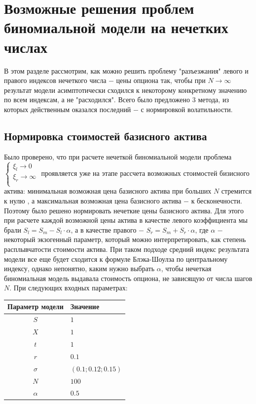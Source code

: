 \documentclass[a4paper,12pt]{extarticle} %
\begin{document}
	\section{Возможные решения проблем биномиальной модели на нечетких числах}
	В этом разделе рассмотрим, как можно решить проблему "разъезжания" левого и правого индексов нечеткого числа $-$ цены опциона так, чтобы при $N \to \infty$ результат модели асимптотически сходился к некоторому конкретному значению по всем индексам, а не "расходился". Всего было предложено $3$ метода, из которых действенным оказался последний $-$ с нормировкой волатильности. 
	
	\subsection{Нормировка стоимостей базисного актива}
	Было проверено, что при расчете нечеткой биномиальной модели проблема 
	$\begin{cases}
		\xi_l \to 0 \\
		\xi_r \to \infty \\
	\end{cases}$ 
	проявляется уже на этапе рассчета возможных стоимостей бизисного актива: минимальная возможная цена базисного актива при больших $N$ стремится к нулю , а максимальная возможная цена базисного актива $-$ к бесконечности. Поэтому было решено нормировать нечеткие цены базисного актива. Для этого при расчете каждой возможной цены актива в качестве левого коэффициента мы брали $S_l = S_m - S_l \cdot \alpha$, а в качестве правого $-$ $S_r = S_m + S_r \cdot \alpha$, где $\alpha$ $-$ некоторый экзогенный параметр, который можно интерпретировать, как степень расплывчатости стоимости актива. При таком подходе средний индекс результата модели все еще будет сходится к формуле Блэка-Шоулза по центральному индексу, однако непонятно, каким нужно выбрать $\alpha$, чтобы нечеткая биномиальная модель выдавала стоимость опциона, не зависящую от числа шагов $N$. При следующих входных параметрах:
	 \begin{center}
	 	\begin{tabular}{|c|l|}
	 		\hline
	 		\textbf{Параметр модели} & \textbf{Значение} \\
	 		\hline
	 		$S$ & $1$ \\
	 		$X$ & $1$ \\
	 		$t$ & $1$ \\
	 		$r$ & $0.1$ \\
	 		$\sigma$ & $(0.1; 0.12; 0.15)$ \\
	 		$N$ & $100$ \\
	 		$\alpha$ & $0.5$ \\
	 		\hline
	 	\end{tabular}
	 \end{center}
	 
\end{document}
